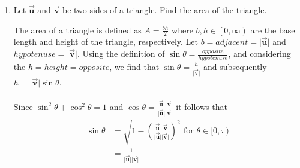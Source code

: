\documentclass{letter}
\newcommand{\norm}[1]{\lvert #1 \rvert}
\newcommand{\Ve}[1]{\langle #1 \rangle}
\newcommand{\Vn}[1]{\vec{\bm{#1}}}
\newcommand\Que[1]{%
   \leavevmode\noindent
   #1
}
\newcommand\Ans[2][]{%
   \leavevmode\noindent
   {
       \begin{mdframed}[backgroundcolor=blue!10]
       #2
       \end{mdframed}
   }
}
\begin{document}
\begin{enumerate}
\begin{enumerate}[label=(\alph*)]
{    \begin{align*}
        \norm{\Vn{u} - \Vn{v}}^2 &= \norm{\Vn{u}}^2 + \norm{\Vn{v}}^2 - 2 \norm{\Vn{u}}\norm{\Vn{v}}\cos{\theta}
    \shortintertext{is true for all non-zero vectors. Thus}
        \norm{\Vn{u} - \Vn{v}}^2  {}&= \norm{\Ve{ u_1-v_1,u_2-v_2,u_3-v_3}}^2 \\ 
        & = (\sqrt{(u_1-v_1)^2+(u_2-v_2)^2+(u_3-v_3)^2})^2 \\
        & = (u_1^2-2u_1v_1+v_1^2)+(u_2^2-2u_2v_2 + v_2^2)+(u_3^2-2u_3v_3+v_3^2) \\
        & = (\sqrt{u_1^2+u_2^2+u_3^2})^2+(\sqrt{v_1^2+v_2^2+v_3^2})^2 - 2(u_1v_1+u_2v_2+u_3v_3)\\
        & = \norm{\Vn{u}}^2 + \norm{\Vn{v}}^2 - 2(\Vn{u} \cdot \Vn{v})
    \shortintertext{and we can rewrite the law of cosines as} 
        \norm{\Vn{u}}^2 + \norm{\Vn{v}}^2-2(\Vn{u} \cdot \Vn{v})&=\norm{\Vn{u}}^2 + 
        \norm{\Vn{v}}^2 - 2 \norm{\Vn{u}}\norm{\Vn{v}}\cos{\theta}
    \shortintertext{simplifying this, we get}
        \Vn{u} \cdot \Vn{v} &= \norm{\Vn{u}}\norm{\Vn{v}}\cos{\theta}
    \end{align*}
    Therefore, we have shown that if $\Vn{u}$ and $\Vn{v} \in \mathbb{R}^3$ are non-zero vectors and 
    $\theta \in [0,\pi)$ is the angle between them, then 
    $\norm{\Vn{u} \cdot \Vn{v}} = \norm{\Vn{u}}\norm{\Vn{v}}\cos{\theta}$ 
    \qed}
    \item \Que{Let $\Vn{u}$ and $\Vn{v}$ be two sides of a triangle.  Find the area of the triangle.}
    \Ans{
        The area of a triangle is defined as $A = \frac{bh}{2}$
        where $b,h \in \left[0, \infty \right)$ 
        are the base length and height of the triangle, respectively.  
        Let $b = adjacent = \norm{\Vn{u}}$ and $hypotenuse = \norm{\Vn{v}}$.  
        Using the definition of $\sin{\theta} = \frac{opposite}{hypotenuse}$, 
        and considering the $h=height = opposite$, 
        we find that $\sin{\theta} = \frac{h}{\norm{\Vn{v}}}$ 
        and subsequently $h = \norm{\Vn{v}}\sin{\theta}$.      
        \\~\\ Since $\sin^2{\theta} + \cos^2{\theta}=1$ 
        and $\cos{\theta} = \frac{\Vn{u}\cdot\Vn{v}}{\norm{\Vn{u}}\norm{\Vn{v}}}$
        it follows that
    \begin{align*}
        \sin{\theta} &= \sqrt{1-\left(\frac{\Vn{u}\cdot\Vn{v}}{\norm{\Vn{u}}\norm{\Vn{v}}}\right)^2} \text{ for }\theta \in [0, \pi) \\
        &= \frac{1}{\norm{\Vn{u}}\norm{\Vn{v}}}

\end{align*}}
\end{enumerate}
\end{enumerate}
\end{document}
